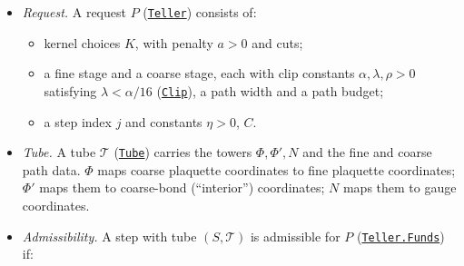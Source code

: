 \documentclass[
  letterpaper,
  11pt]{article}
\providecommand{\tightlist}{%
  \setlength{\itemsep}{0pt}\setlength{\parskip}{0pt}}
\begin{document}
\begin{itemize}
\tightlist
\item
  \emph{Request.} A request \(P\)
  (\href{https://github.com/yang-mills-group/OpenAI-YM-20261028/blob/3456e5e75cf8d4cd558955a5c7638fba2d68f464/YM/Pressure/Seeds.lean\#L89-L96}{\texttt{Teller}})
  consists of:

  \begin{itemize}
  \tightlist
  \item
    kernel choices \(K\), with penalty \(a>0\) and cuts;
  \item
    a fine stage and a coarse stage, each with clip constants
    \(\alpha,\lambda,\rho>0\) satisfying \(\lambda<\alpha/16\)
    (\href{https://github.com/yang-mills-group/OpenAI-YM-20261028/blob/3456e5e75cf8d4cd558955a5c7638fba2d68f464/YM/RG/PathActions.lean\#L139-L146}{\texttt{Clip}}),
    a path width and a path budget;
  \item
    a step index \(j\) and constants \(\eta>0\), \(C\).
  \end{itemize}
\item
  \emph{Tube.} A tube \(\mathscr T\)
  (\href{https://github.com/yang-mills-group/OpenAI-YM-20261028/blob/3456e5e75cf8d4cd558955a5c7638fba2d68f464/YM/Pressure/Rows.lean\#L94-L99}{\texttt{Tube}})
  carries the towers \(\Phi,\Phi',N\) and the fine and coarse path data.
  \(\Phi\) maps coarse plaquette coordinates to fine plaquette
  coordinates; \(\Phi'\) maps them to coarse-bond (``interior'')
  coordinates; \(N\) maps them to gauge coordinates.
\item
  \emph{Admissibility.} A step with tube \((S,\mathscr T)\) is
  admissible for \(P\)
  (\href{https://github.com/yang-mills-group/OpenAI-YM-20261028/blob/3456e5e75cf8d4cd558955a5c7638fba2d68f464/YM/Pressure/Seeds.lean\#L101-L109}{\texttt{Teller.Funds}})
  if:


\end{itemize}
\end{document}
